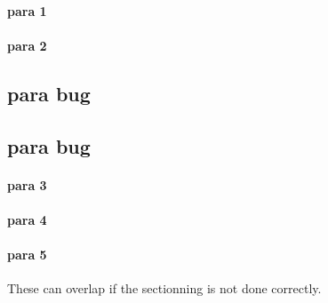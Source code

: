 \paragraph{para 1}
\label{autosec:5}
\paragraph{para 2}
\label{autosec:5}
\subsection{para bug}
\label{autosec:5}
\vspace{-36pt}\hspace{11pt}
\subsection{para bug}
\label{autosec:6}
\vspace{-36pt}\hspace{11pt}
\paragraph{para 3}
\label{autosec:7}
\paragraph{para 4}
\label{autosec:7}
\paragraph{para 5}
\label{autosec:7}
These can overlap if the sectionning is not done correctly.
